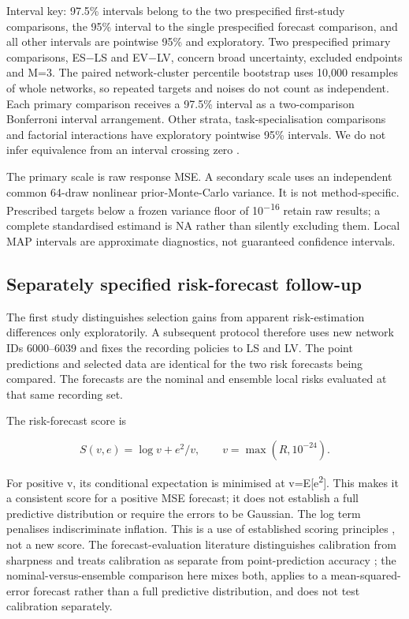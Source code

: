 Interval key: 97.5\% intervals belong to the two prespecified first-study comparisons, the 95\% interval to the single prespecified forecast comparison, and all other intervals are pointwise 95\% and exploratory. Two prespecified primary comparisons, ES−LS and EV−LV, concern broad uncertainty, excluded endpoints and M=3. The paired network-cluster percentile bootstrap \cite{ref38,ref39} uses 10,000 resamples of whole networks, so repeated targets and noises do not count as independent. Each primary comparison receives a 97.5\% interval as a two-comparison Bonferroni interval arrangement. Other strata, task-specialisation comparisons and factorial interactions have exploratory pointwise 95\% intervals. We do not infer equivalence from an interval crossing zero \cite{ref36,ref37}.

The primary scale is raw response MSE. A secondary scale uses an independent common 64-draw nonlinear prior-Monte-Carlo variance. It is not method-specific. Prescribed targets below a frozen variance floor of 10\textsuperscript{−16} retain raw results; a complete standardised estimand is NA rather than silently excluding them. Local MAP intervals are approximate diagnostics, not guaranteed confidence intervals.

\subsection{Separately specified risk-forecast follow-up}

The first study distinguishes selection gains from apparent risk-estimation differences only exploratorily. A subsequent protocol therefore uses new network IDs 6000--6039 and fixes the recording policies to LS and LV. The point predictions and selected data are identical for the two risk forecasts being compared. The forecasts are the nominal and ensemble local risks evaluated at that same recording set.

The risk-forecast score is

\begin{equation}
S(v,e)=\log v+e^2/v,\qquad v=\max(\hat R,10^{-24}).
\end{equation}

For positive v, its conditional expectation is minimised at v=E{[}e\textsuperscript{2}{]}. This makes it a consistent score for a positive MSE forecast; it does not establish a full predictive distribution or require the errors to be Gaussian. The log term penalises indiscriminate inflation. This is a use of established scoring principles \cite{ref14,ref33}, not a new score. The forecast-evaluation literature distinguishes calibration from sharpness \cite{ref34} and treats calibration as separate from point-prediction accuracy \cite{ref35}; the nominal-versus-ensemble comparison here mixes both, applies to a mean-squared-error forecast rather than a full predictive distribution, and does not test calibration separately.

